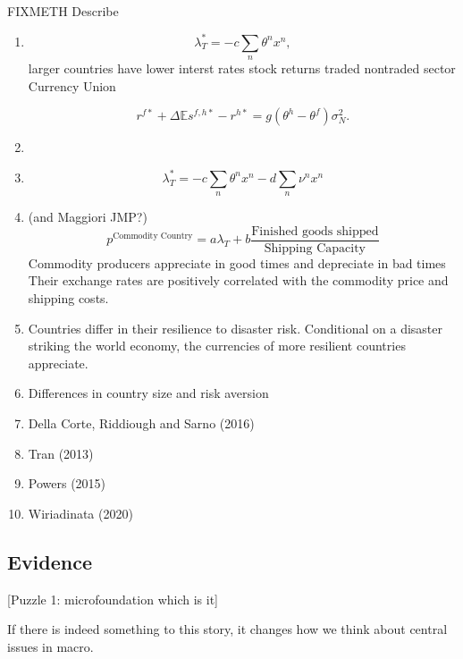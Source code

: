 FIXMETH Describe
\begin{enumerate}
\item \citet{Hassan2013}

  \begin{equation} \lambda_{T}^\ast = -c \sum_{n} \theta^n x^n,
    \label{eqn:lambdat2NP}
  \end{equation}
  larger countries have lower interst rates stock returns traded
  nontraded sector Currency Union

\begin{equation}
  r^{f \ast} + \Delta \mathbb{E} s^{f, h \ast} - r^{h \ast}
  =g\left(\theta^h - \theta^f\right) \sigma_N^2.
  \label{eq_FF_UIP}
\end{equation}
\item \citet{Martin2012}
\item \citet{Richmond2019}

$$\lambda_{T}^\ast = -c
\sum_{n} \theta^n x^n- d\sum_{n} \nu^n x^n$$


\item \citet{Readyetal2013} (and Maggiori JMP?)
$$p^{\text{Commodity Country}}=a\lambda_T+b\frac{\text{Finished goods shipped}}{\text{Shipping Capacity}} $$
Commodity producers appreciate in good times and depreciate in bad
times Their exchange rates are positively correlated with the
commodity price and shipping costs.
\item \citet{FarhiGabaix2016} Countries differ in their resilience to
  disaster risk. Conditional on a disaster striking the world economy,
  the currencies of more resilient countries appreciate.
\item \citet{GourinchasGovillotRey2017} Differences in country size and
  risk aversion
\item Della Corte, Riddiough and Sarno (2016)
\item Tran (2013)
\item Powers (2015)
\item Wiriadinata (2020)
\end{enumerate}

\subsection{Evidence}

[Puzzle 1: microfoundation which is it]

If there is indeed something to this story, it changes how we think
about central issues in macro.
